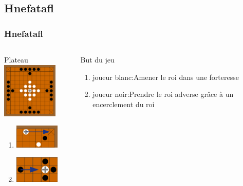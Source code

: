 \documentclass[11pt]{beamer}
\begin{document}
  \subsection[Hnefatafl]{Hnefatafl}
\begin{frame}

\frametitle{Hnefatafl}
\subtitle{Hnefatafl}
\begin{columns}[t]
\begin{column}{4cm}
	\begin{block}{Plateau}
	\centering \includegraphics[width=75pt]{images/tafel.png}
	\begin{enumerate}
		\item \centering \includegraphics[width=60pt]{images/roi2.png}\\
		\item \centering \includegraphics[width=60pt]{images/roi1.png}
	\end{enumerate}
	\end{block} 
\end{column}

\begin{column}{6cm}
	\begin{alertblock}{But du jeu}
		\begin{enumerate}
			\item joueur blanc:Amener le roi dans une forteresse
			\item joueur noir:Prendre le roi adverse grâce à un encerclement du roi
		\end{enumerate}
	\end{alertblock}   
\end{column}
\end{columns}  
\end{frame}
\end{document}
